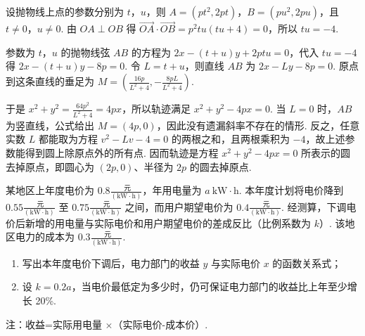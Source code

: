 \begin{solution}
设抛物线上点的参数分别为 \(t\)，\(u\)，则 \(A=(pt^{2},2pt)\)，\(B=(pu^{2},2pu)\)，且 \(t\neq0\)，\(u\neq0\). 由 \(OA\perp OB\) 得 \(\overrightarrow{OA}\cdot\overrightarrow{OB}=p^{2}tu(tu+4)=0\)，所以 \(tu=-4\).

参数为 \(t\)，\(u\) 的抛物线弦 \(AB\) 的方程为 \(2x-(t+u)y+2ptu=0\)，代入 \(tu=-4\) 得 \(2x-(t+u)y-8p=0\). 令 \(L=t+u\)，则直线 \(AB\) 为 \(2x-Ly-8p=0\). 原点到这条直线的垂足为 \(M=\left(\frac{16p}{L^{2}+4},-\frac{8pL}{L^{2}+4}\right)\).

于是 \(x^{2}+y^{2}=\frac{64p^{2}}{L^{2}+4}=4px\)，所以轨迹满足 \(x^{2}+y^{2}-4px=0\). 当 \(L=0\) 时，\(AB\) 为竖直线，公式给出 \(M=(4p,0)\)，因此没有遗漏斜率不存在的情形. 反之，任意实数 \(L\) 都能取为方程 \(v^{2}-Lv-4=0\) 的两根之和，且两根乘积为 \(-4\)，故上述参数能得到圆上除原点外的所有点. 因而轨迹是方程 \(x^{2}+y^{2}-4px=0\) 所表示的圆去掉原点，即圆心为 \((2p,0)\)、半径为 \(2p\) 的圆去掉原点.
\end{solution}

\begin{problem}
某地区上年度电价为 \(0.8\frac{\text{ 元}}{(\mathrm{kW}\cdot\mathrm{h})}\)，年用电量为 \(a\mathrm{~kW\cdot h}\). 本年度计划将电价降到 \(0.55\frac{\text{ 元}}{(\mathrm{kW}\cdot\mathrm{h})}\) 至 \(0.75\frac{\text{ 元}}{(\mathrm{kW}\cdot\mathrm{h})}\) 之间，而用户期望电价为 \(0.4\frac{\text{ 元}}{(\mathrm{kW}\cdot\mathrm{h})}\). 经测算，下调电价后新增的用电量与实际电价和用户期望电价的差成反比（比例系数为 \(k\)）. 该地区电力的成本为 \(0.3\frac{\text{ 元}}{(\mathrm{kW}\cdot\mathrm{h})}\).

\begin{enumerate}
\item 写出本年度电价下调后，电力部门的收益 \(y\) 与实际电价 \(x\) 的函数关系式；
\item 设 \(k=0.2a\)，当电价最低定为多少时，仍可保证电力部门的收益比上年至少增长 20\%.
\end{enumerate}

注：收益=实际用电量 \(\times\)（实际电价-成本价）.
\end{problem}

